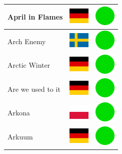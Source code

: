 \documentclass[12pt, a4paper, twoside]{report}
\begin{document}
\begin{center}
\begin{longtable}{|p{5cm}|p{2cm}|p{2cm}|}
April in Flames & \includegraphics[width=1cm]{4x3/de} & \includegraphics[width=1cm]{likes/y} \\ \hline
Arch Enemy & \includegraphics[width=1cm]{4x3/se} & \includegraphics[width=1cm]{likes/y} \\ \hline
Arctic Winter & \includegraphics[width=1cm]{4x3/de} & \includegraphics[width=1cm]{likes/y} \\ \hline
Are we used to it & \includegraphics[width=1cm]{4x3/de} & \includegraphics[width=1cm]{likes/y} \\ \hline
Arkona & \includegraphics[width=1cm]{4x3/pl} & \includegraphics[width=1cm]{likes/y} \\ \hline
Arkuum & \includegraphics[width=1cm]{4x3/de} & \includegraphics[width=1cm]{likes/y} \\ \hline

\end{longtable}
\end{center}
\end{document}

